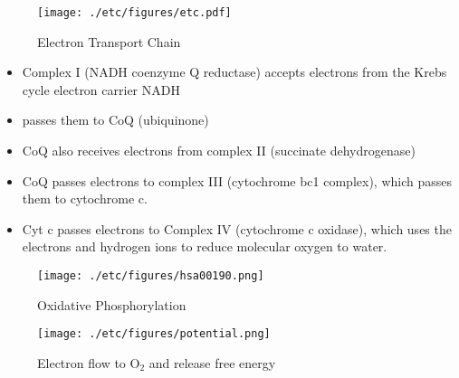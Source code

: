 \documentclass{scrartcl}
\begin{document}
\begin{enumerate}
\begin{figure}[htbp]
\centering
\texttt{[image: ./etc/figures/etc.pdf]}
\caption{\label{fig:orgd98e906}
Electron Transport Chain}
\end{figure}

\begin{itemize}
\item Complex I (NADH coenzyme Q reductase) accepts electrons from the
Krebs cycle electron carrier NADH
\item passes them to CoQ (ubiquinone)
\item CoQ also receives electrons from complex II (succinate dehydrogenase)
\item CoQ passes electrons to complex III (cytochrome bc1 complex), which
passes them to cytochrome c.
\item Cyt c passes electrons to Complex IV (cytochrome c oxidase), which
uses the electrons and hydrogen ions to reduce molecular oxygen to
water.
\end{itemize}

\begin{figure}[htbp]
\centering
\texttt{[image: ./etc/figures/hsa00190.png]}
\caption[ETC]{\label{fig:orgdbde3a8}
Oxidative Phosphorylation}
\end{figure}

\begin{figure}[htbp]
\centering
\texttt{[image: ./etc/figures/potential.png]}
\caption[redox]{\label{fig:org914a3b0}
Electron flow to O\(_{\text{2}}\) and release free energy}
\end{figure}
\end{enumerate}
\end{document}
